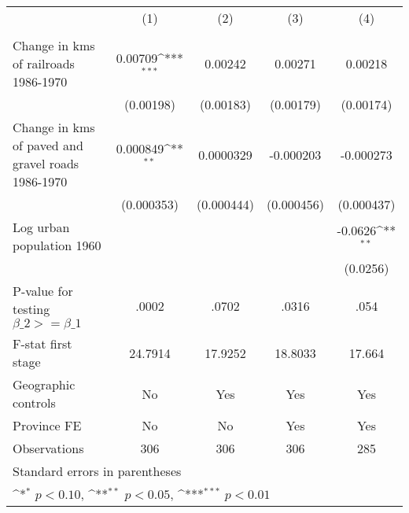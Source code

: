 {
\def\sym#1{\ifmmode^{#1}\else\(^{#1}\)\fi}
\begin{tabular}{l*{4}{c}}
\hline\hline
                &\multicolumn{1}{c}{(1)}&\multicolumn{1}{c}{(2)}&\multicolumn{1}{c}{(3)}&\multicolumn{1}{c}{(4)}\\
                &\multicolumn{1}{c}{}&\multicolumn{1}{c}{}&\multicolumn{1}{c}{}&\multicolumn{1}{c}{}\\
\hline
Change in kms of railroads 1986-1970&  0.00709\sym{***}&  0.00242         &  0.00271         &  0.00218         \\
                &(0.00198)         &(0.00183)         &(0.00179)         &(0.00174)         \\
[1em]
Change in kms of paved and gravel roads 1986-1970& 0.000849\sym{**} &0.0000329         &-0.000203         &-0.000273         \\
                &(0.000353)         &(0.000444)         &(0.000456)         &(0.000437)         \\
[1em]
Log urban population 1960&                  &                  &                  &  -0.0626\sym{**} \\
                &                  &                  &                  & (0.0256)         \\
\hline
P-value for testing $\beta\_{2} >= \beta\_{1}$&    .0002         &    .0702         &    .0316         &     .054         \\
F-stat first stage&  24.7914         &  17.9252         &  18.8033         &   17.664         \\
Geographic controls&       No         &      Yes         &      Yes         &      Yes         \\
Province FE     &       No         &       No         &      Yes         &      Yes         \\
Observations    &      306         &      306         &      306         &      285         \\
\hline\hline
\multicolumn{5}{l}{\footnotesize Standard errors in parentheses}\\
\multicolumn{5}{l}{\footnotesize \sym{*} \(p<0.10\), \sym{**} \(p<0.05\), \sym{***} \(p<0.01\)}\\
\end{tabular}
}
